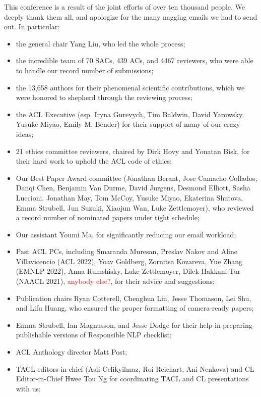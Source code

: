 This conference is a result of the joint efforts of over ten thousand people. We deeply thank them all, and apologize for the many nagging emails we had to send out. In particular:

\begin{itemize}

\item the general chair Yang Liu, who led the whole process;
\item the incredible team of 70 SACs, 439 ACs, and 4467 reviewers, who were able to handle our record number of submissions;
\item the 13,658 authors for their phenomenal scientific contributions, which we were honored to shepherd through the reviewing process;
\item the ACL Executive (esp. Iryna Gurevych, Tim Baldwin, David Yarowsky, Yusuke Miyao, Emily M. Bender) for their support of many of our crazy ideas;
\item 21 ethics committee reviewers, chaired by Dirk Hovy and Yonatan Bisk, for their hard work to uphold the ACL code of ethics;
\item Our Best Paper Award committee (Jonathan Berant, Jose Camacho-Collados, Danqi Chen, Benjamin Van Durme, David Jurgens, Desmond Elliott, Sasha Luccioni, Jonathan May, Tom McCoy, Yusuke Miyao, Ekaterina Shutova, Emma Strubell, 
Jun Suzuki, Xiaojun Wan, Luke Zettlemoyer), who reviewed a record number of nominated papers under tight schedule; 
\item Our assistant Youmi Ma, for significantly reducing our email workload;
\item Past \*ACL PCs, including Smaranda Muresan, Preslav Nakov and 
Aline Villavicencio (ACL 2022), Yoav Goldberg, Zornitsa Kozareva, Yue Zhang (EMNLP 2022), Anna Rumshisky, Luke Zettlemoyer, Dilek Hakkani-Tur (NAACL 2021), \textcolor{red}{anybody else?}, for their advice and suggestions;
\item Publication chairs Ryan Cotterell, Chenghua Lin, Jesse Thomason, Lei Shu, and Lifu Huang, who ensured the proper formatting of camera-ready papers;
\item Emma Strubell, Ian Magnusson, and Jesse Dodge for their help in preparing publishable versions of Responsible NLP checklist; 
\item ACL Anthology director Matt Post;
\item TACL editors-in-chief (Asli Celikyilmaz, Roi Reichart, Ani Nenkova) and CL Editor-in-Chief Hwee Tou Ng for coordinating TACL and CL presentations with us;

\end{itemize}
